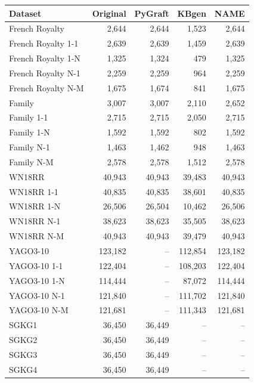 \begin{tabular}{lrrrr}
\toprule
Dataset & Original & PyGraft & KBgen & NAME \\
\midrule
French Royalty & 2{,}644 & 2{,}644 & 1{,}523 & 2{,}644 \\
French Royalty 1-1 & 2{,}639 & 2{,}639 & 1{,}459 & 2{,}639 \\
French Royalty 1-N & 1{,}325 & 1{,}324 & 479 & 1{,}325 \\
French Royalty N-1 & 2{,}259 & 2{,}259 & 964 & 2{,}259 \\
French Royalty N-M & 1{,}675 & 1{,}674 & 841 & 1{,}675 \\
\midrule
Family & 3{,}007 & 3{,}007 & 2{,}110 & 2{,}652 \\
Family 1-1 & 2{,}715 & 2{,}715 & 2{,}050 & 2{,}715 \\
Family 1-N & 1{,}592 & 1{,}592 & 802 & 1{,}592 \\
Family N-1 & 1{,}463 & 1{,}462 & 948 & 1{,}463 \\
Family N-M & 2{,}578 & 2{,}578 & 1{,}512 & 2{,}578 \\
\midrule
WN18RR & 40{,}943 & 40{,}943 & 39{,}483 & 40{,}943 \\
WN18RR 1-1 & 40{,}835 & 40{,}835 & 38{,}601 & 40{,}835 \\
WN18RR 1-N & 26{,}506 & 26{,}504 & 10{,}462 & 26{,}506 \\
WN18RR N-1 & 38{,}623 & 38{,}623 & 35{,}505 & 38{,}623 \\
WN18RR N-M & 40{,}943 & 40{,}943 & 39{,}479 & 40{,}943 \\
\midrule
YAGO3-10 & 123{,}182 & – & 112{,}854 & 123{,}182 \\
YAGO3-10 1-1 & 122{,}404 & – & 108{,}203 & 122{,}404 \\
YAGO3-10 1-N & 114{,}444 & – & 87{,}072 & 114{,}444 \\
YAGO3-10 N-1 & 121{,}840 & – & 111{,}702 & 121{,}840 \\
YAGO3-10 N-M & 121{,}681 & – & 111{,}343 & 121{,}681 \\
\midrule
SGKG1 & 36{,}450 & 36{,}449 & – & – \\
SGKG2 & 36{,}450 & 36{,}449 & – & – \\
SGKG3 & 36{,}450 & 36{,}449 & – & – \\
SGKG4 & 36{,}450 & 36{,}449 & – & – \\
\bottomrule
\end{tabular}
